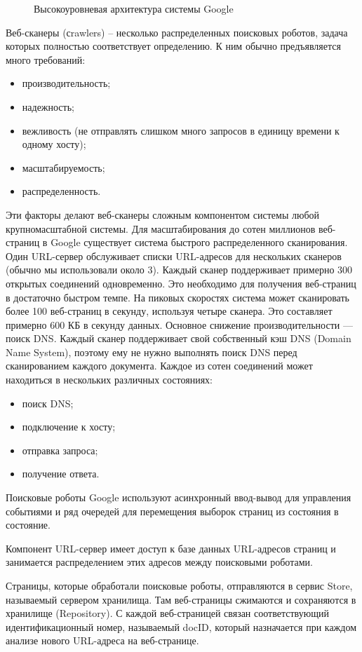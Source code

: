 \begin{figure}
\caption{Высокоуровневая архитектура системы Google}
\label{google:image}
\end{figure}

Веб-сканеры (сrawlers) -- несколько распределенных поисковых роботов, задача которых полностью соответствует определению. К ним обычно предъявляется много требований:
\begin{itemize}
\item производительность;
\item надежность;
\item вежливость (не отправлять слишком много запросов в единицу времени к одному хосту);
\item масштабируемость;
\item распределенность.
\end{itemize}
Эти факторы делают веб-сканеры сложным компонентом системы любой крупномасштабной системы.
Для масштабирования до сотен миллионов веб-страниц в Google существует система быстрого распределенного сканирования. Один URL-сервер обслуживает списки URL-адресов для нескольких сканеров (обычно мы использовали около 3). Каждый сканер поддерживает примерно 300 открытых соединений одновременно. Это необходимо для получения веб-страниц в достаточно быстром темпе. На пиковых скоростях система может сканировать более 100 веб-страниц в секунду, используя четыре сканера. Это составляет примерно 600 КБ в секунду данных. Основное снижение производительности — поиск DNS. Каждый сканер поддерживает свой собственный кэш DNS (Domain Name System), поэтому ему не нужно выполнять поиск DNS перед сканированием каждого документа. Каждое из сотен соединений может находиться в нескольких различных состояниях:
\begin{itemize}
\item поиск DNS;
\item подключение к хосту;
\item отправка запроса;
\item получение ответа.
\end{itemize}
Поисковые роботы Google используют асинхронный ввод-вывод для управления событиями и ряд очередей для перемещения выборок страниц из состояния в состояние.

Компонент URL-сервер имеет доступ к базе данных URL-адресов страниц и занимается распределением этих адресов между поисковыми роботами.

Страницы, которые обработали поисковые роботы, отправляются в сервис Store, называемый сервером хранилища. Там веб-страницы сжимаются и сохраняются в хранилище (Repository). С каждой веб-страницей связан соответствующий идентификационный номер, называемый docID, который назначается при каждом анализе нового URL-адреса на веб-странице.

